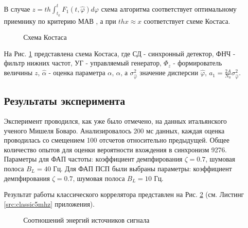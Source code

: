 В случае ${z=th \int_{t_k}^t F_1(t, \hat{\varphi}) \hat{d\varphi}}$ схема алгоритма соответствует оптимальному приемнику по критерию МАВ \cite{shahtarin-wiener-kalman}, а при ${thx \approx x}$
соответствует схеме Костаса.

\begin{figure}[h]
\center{}
	\caption{Схема Костаса}
	\label{pic:sec4_costas}
\end{figure}

На Рис. \ref{pic:sec4_costas} представлена схема Костаса, где СД - синхронный детектор, ФНЧ - фильтр нижних частот, УГ - управляемый генератор, ${\Phi_z}$ - формирователь величины ${z}$,
${\hat{\alpha}}$ - оценка параметра ${\alpha}$, ${\alpha}$, а ${\sigma_{\hat{\varphi}}^2}$ значение дисперсии ${\hat{\varphi}}$, ${a_1 = \frac{2A}{N_0} \sigma_{\hat{\varphi}}^2}$.

\subsection{Результаты эксперимента}

Эксперимент проводился, как уже было отмечено, на данных итальянского ученого Мишеля Боваро. Анализировалось 200 мс данных, каждая оценка проводилась со смещением 100 отсчетов относительно
предыдущей. Общее количество опытов для оценки вероятности вхождения в синхронизм 9276. Параметры для ФАП частоты: коэффициент демпфирования ${\zeta=0.7}$, шумовая полоса  ${B_L=40}$ Гц.
Для ФАП ПСП были выбраны параметры: коэффициент демпфирования ${\zeta=0.7}$, шумовая полоса  ${B_L=10}$ Гц.

Результат работы классического коррелятора представлен на Рис. \ref{pic:5mhz_sats_all} (см. Листинг \ref{src:classic5mhz} приложения).
\begin{figure}[h]
\center{}
	\caption{Соотношений энергий источников сигнала}
	\label{pic:5mhz_sats_all}
\end{figure}

